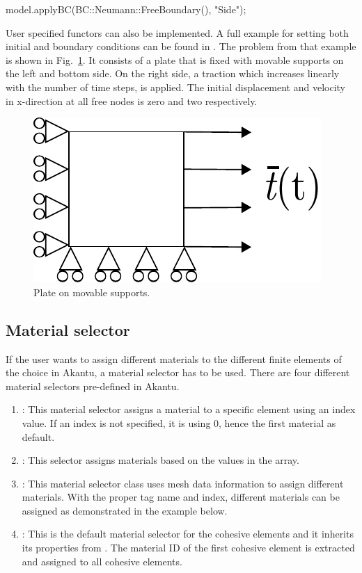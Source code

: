 \begin{cpp}
 model.applyBC(BC::Neumann::FreeBoundary(), "Side");
\end{cpp}

User specified functors can also be implemented.  A full example for
setting both initial and boundary conditions can be found in
.  The problem from
that example is shown in Fig.~\ref{fig:smm:bc_and_ic}. It consists of
a plate that is fixed with movable supports on the left and bottom
side. On the right side, a traction which increases linearly with the
number of time steps, is applied. The initial displacement and
velocity in x-direction at all free nodes is zero and two
respectively.
\begin{figure}[!htb] 
  \centering
  \includegraphics[scale=0.8]{figures/bc_and_ic_example}
  \caption{Plate on movable supports.\label{fig:smm:bc_and_ic}}
\end{figure}

\subsection{Material selector\label{sect:smm:materialselector}}

If the user wants to assign different materials to the different finite elements
of the choice in Akantu, a material selector has to be used. There are four
different material selectors pre-defined in Akantu.

\begin{enumerate}
\item {}: This material selector assigns a material to a
  specific element using an index value. If an index is not specified, it is
  using 0, hence the first material as default.
\item {}: This selector assigns materials based on
  the values in the  array.
\item {}: This material selector class uses mesh
  data information to assign different materials. With the proper tag name and
  index, different materials can be assigned as demonstrated in the example
  below.
\item {}: This is the default material
  selector for the cohesive elements and it inherits its properties from
  . The material ID of the first cohesive element
  is extracted and assigned to all cohesive elements.
\end{enumerate}

